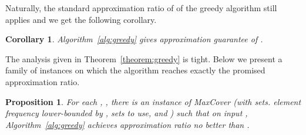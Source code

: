 \documentclass[11pt]{article}
\newtheorem{corollary}[theorem]{Corollary}
\newtheorem{proposition}[theorem]{Proposition}
\begin{document}
Naturally, the standard approximation ratio of  of the
greedy algorithm still applies and we get the following corollary.

\begin{corollary}
Algorithm~\ref{alg:greedy} gives approximation guarantee of .
\end{corollary}

The analysis given in Theorem~\ref{theorem:greedy} is tight. Below we
present a family of instances on which the algorithm reaches exactly
the promised approximation ratio.

\begin{proposition}
  For each , , there is an instance 
  of MaxCover (with  sets. element frequency lower-bounded by ,
   sets to use, and ) such that on input
  , Algorithm~\ref{alg:greedy} achieves approximation ratio
  no better than .
\end{proposition}
\end{document}
